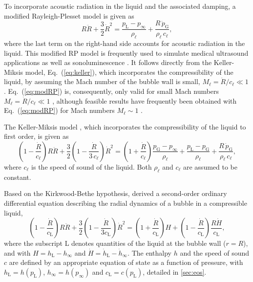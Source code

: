 To incorporate acoustic radiation in the liquid and the associated damping, a modified Rayleigh-Plesset model is given as \citep{Brenner2002}
\begin{equation}
R \ddot{R} + \frac{3}{2} \dot{R}^2 = \frac{p_\text{L} - p_\infty}{\rho_\ell} + \frac{R \, \dot{p}_\text{G}}{\rho_\ell \, c_\ell} ,
\label{eq:modRP}
\end{equation}
where the last term on the right-hand side accounts for acoustic radiation in the liquid.
This modified RP model is frequently used to simulate medical ultrasound applications \citep{Versluis2020} as well as sonoluminescence \citep{Brenner2002}.
It follows directly from the Keller-Miksis model, Eq.~(\ref{eq:keller}), which incorporates the compressibility of the liquid, by assuming the Mach number of the bubble wall is small, $M_\ell  = \dot{R}/c_\ell \ll 1$.
Eq.~(\ref{eq:modRP}) is, consequently, only valid for small Mach numbers $M_\ell =\dot{R}/c_\ell \ll 1$ \citep{Neppiras1980, Prosperetti1986}, although feasible results have frequently been obtained with Eq.~(\ref{eq:modRP}) for Mach numbers $M_\ell \sim 1$ \citep{Brenner2002}.


The Keller-Miksis model \citep{Keller1980, Prosperetti1986}, which incorporates the compressibility of the liquid to first order, is given as
\begin{equation}
\left(1 - \frac{\dot{R}}{c_\ell}\right) R \ddot{R} + \frac{3}{2} \left(1 - \frac{\dot{R}}{3\, c_\ell}\right) \dot{R}^2 =  \left(1 + \frac{\dot{R}}{c_\ell}\right) \frac{p_\text{G} - p_\infty}{\rho_\ell} + \frac{p_\text{L} - p_\text{G}}{\rho_\ell}  + \frac{R \, \dot{p}_\text{G}}{\rho_\ell \, c_\ell} ,
\label{eq:keller}
\end{equation}
where $c_\ell$ is the speed of sound of the liquid. Both $\rho_\ell$ and $c_\ell$ are assumed to be constant.

Based on the Kirkwood-Bethe hypothesis, \citet{Gilmore1952} derived a
second-order ordinary differential equation describing the radial dynamics of a bubble in a compressible liquid, %
\begin{equation}
  \left( 1 - \frac{\dot{R}}{c_\text{L}} \right) R \ddot{R} + \frac{3}{2} \left( 1 - \frac{\dot{R}}{3 c_\text{L}} \right) \dot{R}^2  = \left( 1 + \frac{\dot{R}}{c_\text{L}} \right) H + \left( 1- \frac{\dot{R}}{c_\text{L}} \right) \frac{R \dot{H}}{c_\text{L}}, \label{eq:gilmore}
\end{equation} 
where the subscript L denotes quantities of the liquid at the bubble wall ($r=R$), and with $H = h_\text{L} - h_\infty$ and $\dot{H} = \dot{h}_\text{L} - \dot{h}_\infty$. The enthalpy $h$ and the speed of sound $c$ are defined by an appropriate equation of state as a function of pressure, with $h_\text{L} = h(p_\text{L})$, $h_\infty = h(p_\infty)$ and $c_\text{L} = c(p_\text{L})$, detailed in \ref{sec:eos}.

